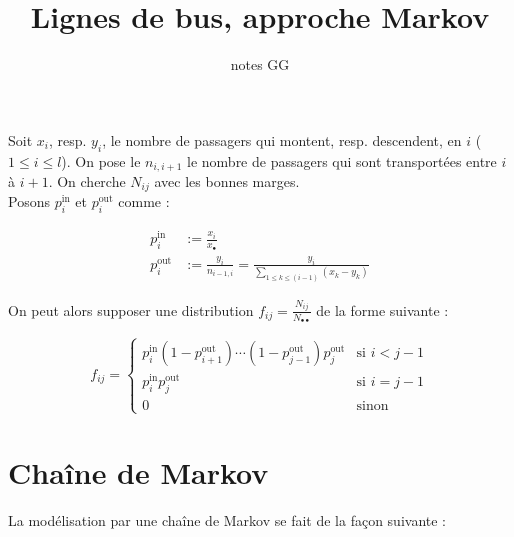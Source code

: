 \documentclass[11p]{article}
\title{Lignes de bus, approche Markov}
\author{notes GG}
\begin{document}
	
\maketitle
Soit $x_i$, resp. $y_i$, le nombre de passagers qui montent, resp. descendent, en $i$ ($1 \leq i \leq l$). On pose le $n_{i, i+1}$ le nombre de passagers qui sont transportées entre $i$
à $i+1$. On cherche $N_{ij}$ avec les bonnes marges. \\

Posons $p^\text{in}_i$ et $p^\text{out}_i$ comme :

\begin{align}
p^\text{in}_i &:= \frac{x_i}{x_\bullet} \\
p^\text{out}_i &:= \frac{y_i}{n_{i-1, i}} = \frac{y_i}{\sum_{1 \leq k \leq (i-1)} (x_k - y_k)}
\end{align}

On peut alors supposer une distribution $f_{ij} = \frac{N_{ij}}{N_{\bullet \bullet}}$ de la forme suivante :

\begin{equation}
f_{ij} = \begin{cases}
p^\text{in}_i (1 - p^\text{out}_{i+1}) \cdots (1 - p^\text{out}_{j-1}) p^\text{out}_j & \text{si } i < j - 1 \\
p^\text{in}_i p_j^\text{out} & \text{si } i = j - 1 \\
0 & \text{sinon}
\end{cases}
\end{equation}

\section{Chaîne de Markov}

La modélisation par une chaîne de Markov se fait de la façon suivante :
\end{document}
